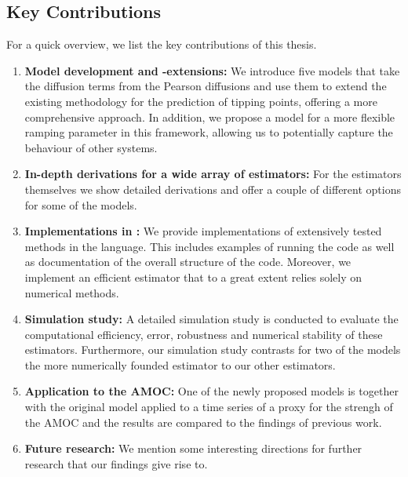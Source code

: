 \subsection{Key Contributions}
For a quick overview, we list the key contributions of this thesis.
\begin{enumerate}
    \item \textbf{Model development and -extensions:} We introduce five models that take the diffusion terms from the Pearson diffusions and use them to extend the existing methodology for the prediction of tipping points, offering a more comprehensive approach. In addition, we propose a model for a more flexible ramping parameter in this framework, allowing us to potentially capture the behaviour of other systems.
    \item \textbf{In-depth derivations for a wide array of estimators:} For the estimators themselves we show detailed derivations and offer a couple of different options for some of the models. 
    \item \textbf{Implementations in :} We provide implementations of extensively tested methods in the  language. This includes examples of running the code as well as documentation of the overall structure of the code. Moreover, we implement an efficient estimator that to a great extent relies solely on numerical methods. 
    \item \textbf{Simulation study:} A detailed simulation study is conducted to evaluate the computational efficiency, error, robustness and numerical stability of these estimators. Furthermore, our simulation study contrasts for two of the models the more numerically founded estimator to our other estimators. 
    \item \textbf{Application to the AMOC:} One of the newly proposed models is together with the original model applied to a time series of a proxy for the strengh of the AMOC and the results are compared to the findings of previous work.
    \item \textbf{Future research:} We mention some interesting directions for further research that our findings give rise to.
\end{enumerate}
